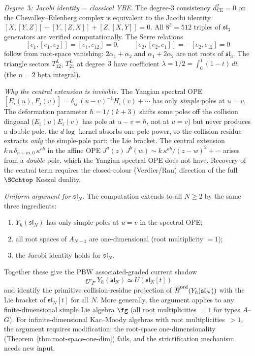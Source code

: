 \begin{computation}
\emph{Degree~$3$: Jacobi identity = classical YBE.}\enspace
The degree-$3$ consistency
$d^2_{\mathrm{CE}}=0$ on the Chevalley--Eilenberg complex
is equivalent to the Jacobi identity
$[X,[Y,Z]]+[Y,[Z,X]]+[Z,[X,Y]]=0$.
All $8^3=512$ triples of $\mathfrak{sl}_3$ generators are
verified computationally. The Serre relations
\[
[e_1,[e_1,e_2]]=[e_1,e_{12}]=0,
\qquad
[e_2,[e_2,e_1]]=-[e_2,e_{12}]=0
\]
follow from root-space vanishing:
$2\alpha_1+\alpha_2$ and $\alpha_1+2\alpha_2$ are not
roots of $\mathfrak{sl}_3$. The triangle sectors
$T^L_{12}$, $T^L_{21}$ at degree~$3$ have coefficient
$\lambda=1/2=\int_0^1(1-t)\,dt$ (the $n=2$ beta integral).

\emph{Why the central extension is invisible.}\enspace
The Yangian spectral OPE
$[E_i(u),F_j(v)]=\delta_{ij}\,(u{-}v)^{-1}H_i(v)+\cdots$
has only \emph{simple} poles at $u=v$. The deformation
parameter $\hbar=1/(k{+}3)$ shifts some poles off the
collision diagonal ($E_i(u)E_i(v)$ has pole at $u{-}v=\hbar$,
not at $u=v$) but never produces a double pole. the $d\!\log$ kernel absorbs one pole power, so the collision
residue extracts \emph{only} the simple-pole part:
the Lie bracket. The central extension
$k\,n\,\delta_{n+m,0}\,\kappa^{ab}$ in the affine OPE
$J^a(z)\,J^b(w)\sim k\,\kappa^{ab}/(z{-}w)^2+\cdots$
arises from a \emph{double} pole, which the Yangian
spectral OPE does not have. Recovery of the central
term requires the closed-colour (Verdier/Ran) direction of
the full $\SCchtop$ Koszul duality.

\emph{Uniform argument for $\mathfrak{sl}_N$.}\enspace
The computation extends to all $N\ge 2$ by the same three
ingredients:
\begin{enumerate}[label=\textup{(\roman*)},nosep]
\item $Y_\hbar(\mathfrak{sl}_N)$ has only simple poles at
$u=v$ in the spectral OPE;
\item all root spaces of $A_{N-1}$ are one-dimensional
(root multiplicity $=1$);
\item the Jacobi identity holds for $\mathfrak{sl}_N$.
\end{enumerate}
Together these give the PBW associated-graded current shadow
\[
\operatorname{gr}_F Y_\hbar(\mathfrak{sl}_N)
\simeq U(\mathfrak{sl}_N[t])
\]
and identify the primitive collision-residue projection of
\(\overline{B}^{\mathrm{ord}}(Y_\hbar(\mathfrak{sl}_N))\) with the Lie bracket of
\(\mathfrak{sl}_N[t]\) for all \(N\).
More generally, the argument applies to any
finite-dimensional simple Lie algebra $\fg$ (all root
multiplicities $=1$ for types $A$--$G$). For
infinite-dimensional Kac--Moody algebras with root
multiplicities~$>1$, the argument requires modification:
the root-space one-dimensionality
(Theorem~\ref{thm:root-space-one-dim}) fails, and the
strictification mechanism needs new input.
\end{computation}

